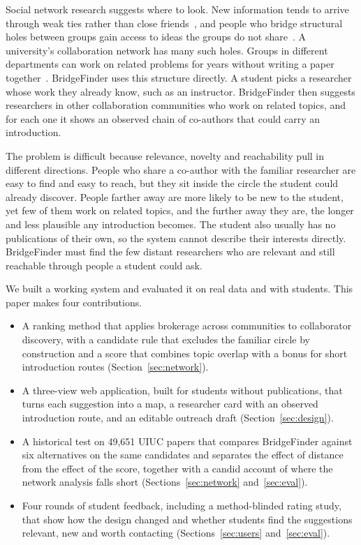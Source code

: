\documentclass[sigconf,nonacm]{acmart}
\begin{document}
Social network research suggests where to look. New information tends to arrive through weak ties rather than close friends~\cite{granovetter1973}, and people who bridge structural holes between groups gain access to ideas the groups do not share~\cite{burt1992,burt2004}. A university's collaboration network has many such holes. Groups in different departments can work on related problems for years without writing a paper together~\cite{dahlander2013,barley2025}. BridgeFinder uses this structure directly. A student picks a researcher whose work they already know, such as an instructor. BridgeFinder then suggests researchers in other collaboration communities who work on related topics, and for each one it shows an observed chain of co-authors that could carry an introduction.

The problem is difficult because relevance, novelty and reachability pull in different directions. People who share a co-author with the familiar researcher are easy to find and easy to reach, but they sit inside the circle the student could already discover. People farther away are more likely to be new to the student, yet few of them work on related topics, and the further away they are, the longer and less plausible any introduction becomes. The student also usually has no publications of their own, so the system cannot describe their interests directly. BridgeFinder must find the few distant researchers who are relevant and still reachable through people a student could ask.

We built a working system and evaluated it on real data and with students. This paper makes four contributions.
\begin{itemize}
\item A ranking method that applies brokerage across communities to collaborator discovery, with a candidate rule that excludes the familiar circle by construction and a score that combines topic overlap with a bonus for short introduction routes (Section~\ref{sec:network}).
\item A three-view web application, built for students without publications, that turns each suggestion into a map, a researcher card with an observed introduction route, and an editable outreach draft (Section~\ref{sec:design}).
\item A historical test on 49,651 UIUC papers that compares BridgeFinder against six alternatives on the same candidates and separates the effect of distance from the effect of the score, together with a candid account of where the network analysis falls short (Sections~\ref{sec:network} and~\ref{sec:eval}).
\item Four rounds of student feedback, including a method-blinded rating study, that show how the design changed and whether students find the suggestions relevant, new and worth contacting (Sections~\ref{sec:users} and~\ref{sec:eval}).
\end{itemize}
\end{document}
